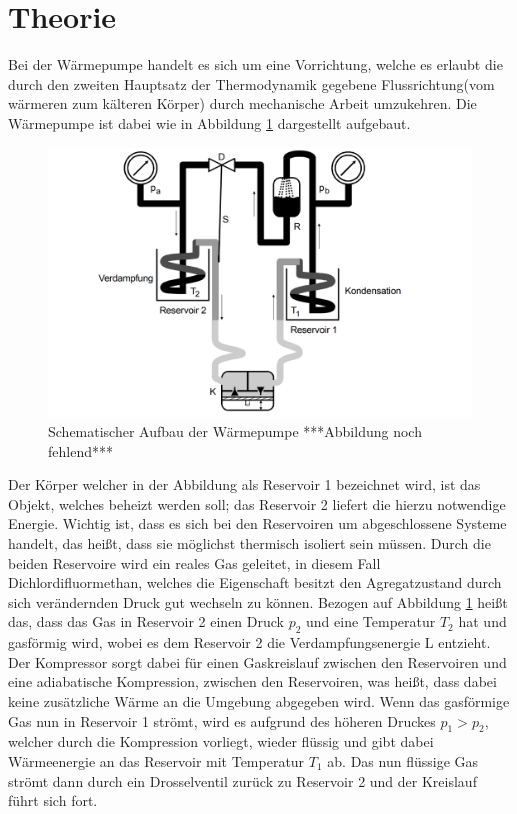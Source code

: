 \section{Theorie}
\label{sec:Theorie}
Bei der Wärmepumpe handelt es sich um eine Vorrichtung, welche es erlaubt die durch den zweiten Hauptsatz der Thermodynamik gegebene Flussrichtung(vom wärmeren zum kälteren Körper) durch
mechanische Arbeit umzukehren. Die Wärmepumpe ist dabei wie in Abbildung \ref{fig:skizze} dargestellt aufgebaut.
\begin{figure}
  \centering
  \includegraphics{content/skizze.png}
  \caption{Schematischer Aufbau der Wärmepumpe ***Abbildung noch fehlend*** \cite[193]{206}}
  \label{fig:skizze}
\end{figure}
Der Körper welcher in der Abbildung als Reservoir 1 bezeichnet wird, ist das Objekt, welches beheizt werden soll; das Reservoir 2 liefert die hierzu notwendige Energie.
Wichtig ist, dass es sich bei den Reservoiren um abgeschlossene Systeme handelt, das heißt, dass sie möglichst thermisch isoliert sein müssen.
Durch die beiden Reservoire wird ein reales Gas geleitet, in diesem Fall Dichlordifluormethan, welches die Eigenschaft besitzt den Agregatzustand durch sich verändernden Druck gut wechseln zu können.
Bezogen auf Abbildung \ref{fig:skizze} heißt das, dass das Gas in Reservoir 2 einen Druck $p_2$ und eine Temperatur $T_2$ hat und gasförmig wird, wobei es dem Reservoir 2 die Verdampfungsenergie L entzieht. 
Der Kompressor sorgt dabei für einen Gaskreislauf zwischen den Reservoiren und eine adiabatische Kompression, zwischen den Reservoiren, was heißt, dass dabei keine zusätzliche Wärme an die Umgebung abgegeben wird.
Wenn das gasförmige Gas nun in Reservoir 1 strömt, wird es aufgrund des höheren Druckes $p_1 > p_2$, welcher durch die Kompression vorliegt, wieder flüssig und gibt dabei Wärmeenergie an das Reservoir mit Temperatur $T_1$ ab. Das nun flüssige Gas strömt dann durch ein Drosselventil zurück zu Reservoir 2 und der Kreislauf führt sich fort.
